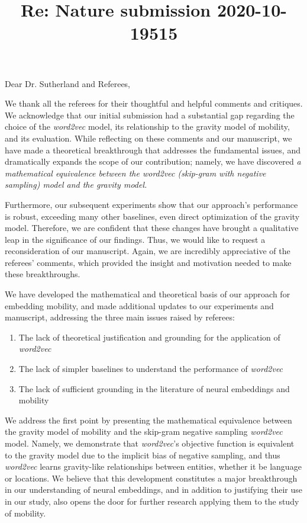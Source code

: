 \documentclass[12pt,a4paper]{article}
\title{Re: Nature submission 2020-10-19515}
\date{}
\makeatletter
\newcounter{comment}[subsection]
\renewcommand{\maketitle}{\bgroup\setlength{\parindent}{0pt}
\begin{flushleft}
\Large  \textbf{\@title}
\end{flushleft}\egroup
}
\makeatother
\begin{document}
\maketitle

\bigskip
\thispagestyle{empty}
\vspace{-0.4cm}
\noindent Dear Dr. Sutherland and Referees,\\
\vspace{-0.25cm}

We thank all the referees for their thoughtful and helpful comments and critiques.
We acknowledge that our initial submission had a substantial gap regarding the choice of the \textit{word2vec} model, its relationship to the gravity model of mobility, and its evaluation.
While reflecting on these comments and our manuscript, we have made a theoretical breakthrough that addresses the fundamental issues, and dramatically expands the scope of our contribution;
namely, we have discovered \emph{a mathematical equivalence between the \textit{word2vec} (skip-gram with negative sampling) model and the gravity model.}

Furthermore, our subsequent experiments show that our approach's performance is robust, exceeding many other baselines, even direct optimization of the gravity model.
Therefore, we are confident that these changes have brought a qualitative leap in the significance of our findings.
Thus, we would like to request a reconsideration of our manuscript.
Again, we are incredibly appreciative of the referees' comments, which provided the insight and motivation needed to make these breakthroughs.

We have developed the mathematical and theoretical basis of our approach for embedding mobility, and made additional updates to our experiments and manuscript, addressing the three main issues raised by referees:
\vspace{-0.1cm}
\begin{enumerate}
	\itemsep0em
	\item The lack of theoretical justification and grounding for the application of \textit{word2vec}
	\item The lack of simpler baselines to understand the performance of \textit{word2vec}
	\item The lack of sufficient grounding in the literature of neural embeddings and mobility
\end{enumerate}
\vspace{-0.1cm}
We address the first point by presenting the mathematical equivalence between the gravity model of mobility and the skip-gram negative sampling \textit{word2vec} model.
Namely, we demonstrate that \textit{word2vec}'s objective function is equivalent to the gravity model due to the implicit bias of negative sampling,  and thus \textit{word2vec} learns gravity-like relationships between entities, whether it be language or locations.
We believe that this development constitutes a major breakthrough in our understanding of neural embeddings, and in addition to justifying their use in our study, also opens the door for further research applying them to the study of mobility.
\end{document}
